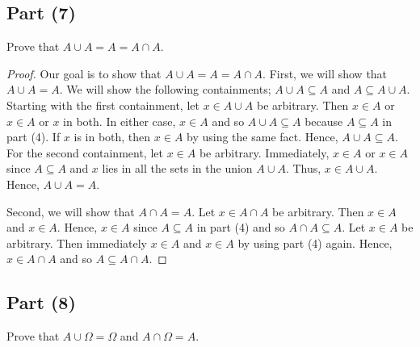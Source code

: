 \documentclass[a4paper]{article}
\begin{document}
\subsection*{Part (7)}

Prove that \( A \cup A = A = A \cap A  \).

\begin{proof}
Our goal is to show that \( A \cup A = A = A \cap A  \). First, we will show that \( A \cup A = A  \). We will show the following containments; \( A \cup A \subseteq A  \) and \( A \subseteq  A \cup A  \). Starting with the first containment, let \( x \in A \cup A  \) be arbitrary. Then \( x \in A  \) or \( x \in A  \) or \( x  \) in both. In either case, \( x \in A  \) and so \( A \cup A \subseteq A  \) because \( A \subseteq  A  \) in part (4). If \( x  \) is in both, then \( x \in A  \) by using the same fact. Hence, \( A \cup A \subseteq  A  \). For the second containment, let \( x \in A  \) be arbitrary. Immediately, \( x \in A  \) or \( x \in A  \) since \( A \subseteq  A  \) and \( x  \) lies in all the sets in the union \( A \cup A  \). Thus, \( x \in A \cup A  \). Hence, \( A \cup A = A  \).   

Second, we will show that \( A \cap A = A  \). Let \( x \in A \cap A  \) be arbitrary. Then \( x \in A  \) and \( x \in A  \). Hence, \( x \in A  \) since \( A \subseteq  A   \) in part (4) and so \( A \cap A \subseteq  A  \). Let \( x \in A  \) be arbitrary. Then immediately \( x \in A  \) and \( x \in A  \) by using part (4) again. Hence, \( x \in A \cap A  \) and so \( A \subseteq A \cap A  \).
\end{proof}

\subsection*{Part (8)}

Prove that \( A \cup \Omega = \Omega \) and \( A \cap \Omega = A   \).
\end{document}
